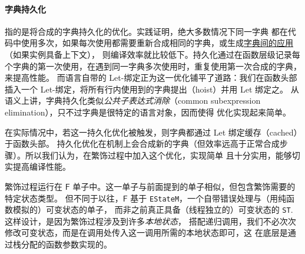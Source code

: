 \paragraph{字典持久化} 指的是将合成的字典持久化的优化。实践证明，绝大多数情况下同一字典
都在代码中使用多次，如果每次使用都需要重新合成相同的字典，或生成\underline{字典间的应用}（如果实例具备上下文），
则编译效率就比较低下。持久化通过在函数层级记录每个字典的第一次使用，在遇到同一字典多次使用时，重复使用第一次合成的字典，来提高性能。
而语言自带的 Let-绑定正为这一优化铺平了道路：我们在函数头部插入一个 Let-绑定，将所有行内使用到的字典提出（hoist）并用 Let 绑定之。
从语义上讲，字典持久化类似\emph{公共子表达式消除}（common subexpression elimination），只不过字典是很特定的语言对象，因而使得
优化实现起来简单。
%

在实际情况中，若这一持久化优化被触发，则字典都通过 Let 绑定缓存（cached）于函数头部。
持久化优化在机制上会合成新的字典（但效率远高于正常合成步骤）。所以我们认为，在繁饰过程中加入这个优化，实现简单
且十分实用，能够切实提高编译性能。

繁饰过程运行在 $\mathsf{F}$ 单子中。这一单子与前面提到的单子相似，但包含繁饰需要的特定状态类型。
但不同于以往，$\mathsf{F}$ 基于 \texttt{EStateM}，一个自带错误处理与（用纯函数模拟的）可变状态的单子，
而非之前真正具备（线程独立的）可变状态的 \texttt{ST}. 这样设计，是因为繁饰过程涉及到许多\emph{本地状态}，
搭配递归调用，我们不必次次修改可变状态，而是在调用处传入这一调用所需的本地状态即可，这
在底层是通过栈分配的函数参数实现的。

